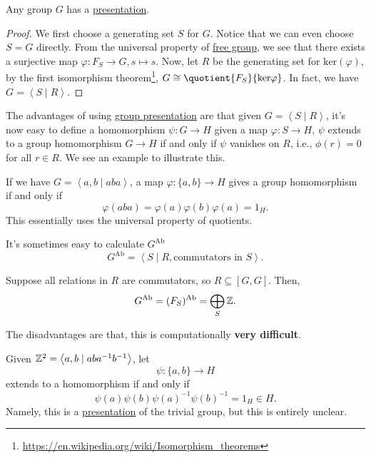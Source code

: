 \begin{theorem}
	Any group \(G\) has a \hyperref[def:group-presentation]{presentation}.
\end{theorem}
\begin{proof}
	We first choose a generating set \(S\) for \(G\). Notice that we can even choose \(S = G\) directly. From the universal property of \hyperref[def:free-group]{free group},
	we see that there exists a surjective map \(\varphi \colon F_S \to G, s \mapsto s\). Now, let \(R\) be the generating set for \(\mathrm{ker}(\varphi) \),
	by the first isomorphism theorem\footnote{\url{https://en.wikipedia.org/wiki/Isomorphism_theorems}}, \(G\cong \quotient{F_S}{\mathrm{ker} \varphi}\).
	In fact, we have \(G = \left< S \mid R \right> \).
\end{proof}

\hr
\begin{remark}
	The advantages of using \hyperref[def:group-presentation]{group presentation} are that given \(G = \left< S \mid R \right> \), it's now easy to define
	a homomorphism \(\psi \colon G\to H\) given a map \(\varphi \colon S\to H\), \(\psi \) extends to a group homomorphism \(G\to H\) if and only if \(\psi \)
	vanishes on \(R\), i.e., \(\phi (r) = 0\) for all \(r\in R\). We see an example to illustrate this.

	\begin{eg}
		If we have \(G = \left< a, b \mid aba \right> \), a map \(\varphi \colon \{a, b\}\to H\) gives a group homomorphism if and only if
		\[
			\varphi (aba) = \varphi (a)\varphi (b)\varphi (a) = 1_H.
		\]
		This essentially uses the universal property of quotients.
	\end{eg}
\end{remark}

\hr

\begin{remark}
	It's sometimes easy to calculate \(G^{\mathrm{Ab}}\)
	\[
		G^{\mathrm{Ab}} = \left< S \mid R, \text{commutators in \(S\)}\right>.
	\]
	\begin{eg}
		Suppose all relations in \(R\) are commutators, so \(R\subseteq[G, G]\). Then,
		\[
			G^{\mathrm{Ab}} = (F_S)^{\mathrm{Ab}} = \bigoplus_S \mathbb{\MakeUppercase{z}}.
		\]
	\end{eg}
\end{remark}
\begin{remark}
	The disadvantages are that, this is computationally \textbf{very difficult}.
\end{remark}
\hr

\begin{eg}
	Given \(\mathbb{\MakeUppercase{z}} ^2 = \left< a, b \mid aba^{-1} b^{-1}  \right> \), let
	\[
		\psi \colon \{a, b\}\to H
	\]
	extends to a homomorphism if and only if
	\[
		\psi (a)\psi (b)\psi (a)^{-1} \psi (b)^{-1} = 1_H\in H.
	\]
	Namely, this is a \hyperref[def:group-presentation]{presentation} of the trivial group, but this is entirely unclear.
\end{eg}